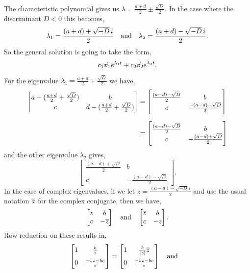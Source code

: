 \documentclass[../MathsNotesBase.tex]{subfiles}
\begin{document}
{		The characteristic polynomial gives us ${ \lambda = \frac{a+d}{2} \pm \frac{\sqrt{D}}{2} }$. In the case where the discriminant ${ D < 0 }$ this becomes,
		\[ \lambda_1 = \frac{(a+d) + \sqrt{-D} \, i}{2} \hspace{10pt}\text{and}\hspace{10pt} \lambda_2 = \frac{(a+d) - \sqrt{-D} \, i}{2}. \]
		So the general solution is going to take the form,
		\[ c_1 \vec{\bm{v}}_1 e^{\lambda_1 t} + c_2 \vec{\bm{v}}_2 e^{\lambda_2 t}. \]

		For the eigenvalue ${ \lambda_1 = \frac{a+d}{2} + \frac{\sqrt{D}}{2} }$ we have,
		\[\begin{aligned}
			\begin{bmatrix}
				a - (\frac{a+d}{2} + \frac{\sqrt{D}}{2}) & b\\
				c & d - (\frac{a+d}{2} + \frac{\sqrt{D}}{2})
			\end{bmatrix} &=
			\begin{bmatrix}
				\frac{(a-d) - \sqrt{D}}{2} & b\\
				c & \frac{-(a-d) - \sqrt{D}}{2}
			\end{bmatrix} \nn
			&= \begin{bmatrix}
					\frac{(a-d) - \sqrt{D}}{2} & b\\
					c & -\frac{(a-d) + \sqrt{D}}{2}
				\end{bmatrix} \\
		\end{aligned}\]
		and the other eigenvalue $\lambda_2$ gives,
		\[ 
			\begin{bmatrix}
				\frac{(a-d) + \sqrt{D}}{2} & b\\
				c & -\frac{(a-d) - \sqrt{D}}{2}
			\end{bmatrix}.
		\]
		In the case of complex eigenvalues, if we let ${ z = \frac{(a-d) - \sqrt{-D}\, i}{2} }$ and use the usual notation $\overline{z}$ for the complex conjugate, then we have,
		\[
			\begin{bmatrix}
				z & b\\
				c & -\overline{z}
			\end{bmatrix} \hspace{10pt}\text{and}\hspace{10pt}
			\begin{bmatrix}
				\overline{z} & b\\
				c & -z
			\end{bmatrix}.
		\]
		Row reduction on these results in,
		\[
			\begin{bmatrix}
				1 & \frac{b}{z} \nn
				0 & \frac{-\conj{z}z - bc}{z}
			\end{bmatrix} =
			\begin{bmatrix}
				1 & \frac{b}{\abs{z}}\conj{z} \nn
				0 & \frac{-\conj{z}z - bc}{z}
			\end{bmatrix} \eqand
\]}
\end{document}
